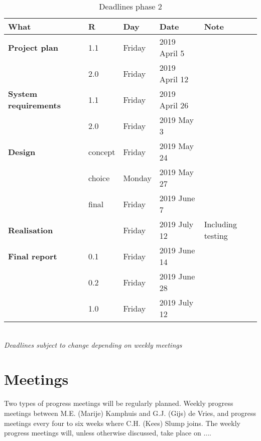 \begin{table}[h!]
	\begin{tabular}{l|llll}
		\textbf{What} 		&	R	& 	Day	&	Date	&	Note \\
		\hline
		\textbf{Project plan}& 1.1	& Friday 		& 2019 April 5	&	 \\
		\rowcolor{Gray}
		 	&	2.0 	&	 Friday & 2019 April 12 & \\
		 	\hline
		\textbf{System requirements} & 1.1 & Friday & 2019 April 26 & \\
		\rowcolor{Gray}
		 & 2.0 & Friday & 2019 May 3 & \\
		\hline
		\textbf{Design} & concept & Friday & 2019 May 24 & \\
		\rowcolor{Gray}
		 & choice & Monday & 2019 May 27 &  \\
		 & final  & Friday & 2019 June 7 & \\
		 \rowcolor{Gray}
		 \hline
		 \textbf{Realisation} & & Friday & 2019 July 12 & Including testing\\
		 \hline
		 \textbf{Final report} & 0.1 & Friday & 2019 June 14 & \\
		 \rowcolor{Gray}
		 & 0.2 & Friday & 2019 June 28 & \\
		 & 1.0 & Friday & 2019 July 12 & \\
		 \hline
	\end{tabular} \\
	\textit{Deadlines subject to change depending on weekly meetings}
	\caption{Deadlines phase 2}
	\label{tab:deadlines2}
\end{table}

\section{Meetings}
Two types of progress meetings will be regularly planned. Weekly progress meetings between M.E. (Marije) Kamphuis and G.J. (Gijs) de Vries, and progress meetings every four to six weeks where C.H. (Kees) Slump joins. The weekly progress meetings will, unless otherwise discussed, take place on ....

